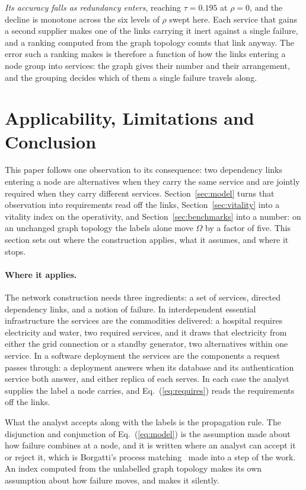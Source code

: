 \documentclass{svproc}
\begin{document}
\emph{Its accuracy falls as redundancy enters}, reaching $\tau = 0.195$ at
$\rho = 0$, and the decline is monotone across the six levels of $\rho$ swept here.
Each service that gains a second supplier makes one of the links carrying it inert
against a single failure, and a ranking computed from the graph topology counts that
link anyway. The error such a ranking makes is therefore a function of how the links
entering a node group into services: the graph gives their number and their
arrangement, and the grouping decides which of them a single failure travels along.




\section{Applicability, Limitations and Conclusion}
\label{sec:conclusion}

This paper follows one observation to its consequence: two dependency links
entering a node are alternatives when they carry the same service and are
jointly required when they carry different services. Section~\ref{sec:model}
turns that observation into requirements read off the links,
Section~\ref{sec:vitality} into a vitality index on the operativity, and
Section~\ref{sec:benchmarks} into a number: on an unchanged graph topology the
labels alone move $\Omega$ by a factor of five. 
This section sets out where the construction applies, what it assumes, and where it stops.

\paragraph{Where it applies.}
The network construction needs three ingredients: a set of services, directed
dependency links, and a notion of failure. In interdependent essential infrastructure the
services are the commodities delivered: a hospital requires electricity and
water, two required services, and it draws that electricity from either the grid
connection or a standby generator, two alternatives within one service. In a
software deployment the services are the components a request passes through: a
deployment answers when its database and its authentication service both answer,
and either replica of each serves. In each case the analyst supplies the label a
node carries, and Eq.~(\ref{eq:requires}) reads the requirements off the links.

What the analyst accepts along with the labels is the propagation rule. The
disjunction and conjunction of Eq.~(\ref{eq:model}) is the assumption made about
how failure combines at a node, and it is written where an analyst can accept it
or reject it, which is Borgatti's process
matching~\cite{borgatti_centrality_2005} made into a step of the work. An index
computed from the unlabelled graph topology makes its own assumption about how
failure moves, and makes it silently.
\end{document}
